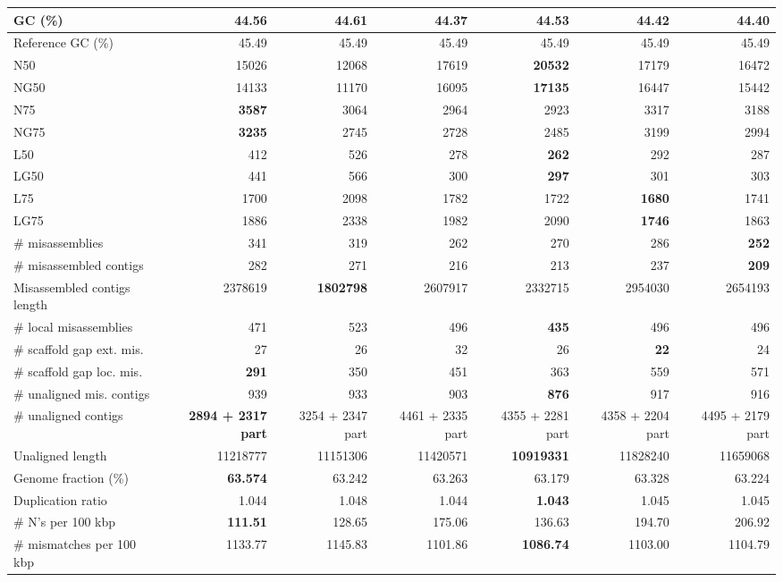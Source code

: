 \documentclass[12pt,a4paper]{article}
\begin{document}
\begin{table}[ht]
\begin{center}
\begin{tabular}{|l*{6}{|r}|}
GC (\%) & 44.56 & 44.61 & 44.37 & 44.53 & 44.42 & 44.40 \\ \hline
Reference GC (\%) & 45.49 & 45.49 & 45.49 & 45.49 & 45.49 & 45.49 \\ \hline
N50 & 15026 & 12068 & 17619 & {\bf 20532} & 17179 & 16472 \\ \hline
NG50 & 14133 & 11170 & 16095 & {\bf 17135} & 16447 & 15442 \\ \hline
N75 & {\bf 3587} & 3064 & 2964 & 2923 & 3317 & 3188 \\ \hline
NG75 & {\bf 3235} & 2745 & 2728 & 2485 & 3199 & 2994 \\ \hline
L50 & 412 & 526 & 278 & {\bf 262} & 292 & 287 \\ \hline
LG50 & 441 & 566 & 300 & {\bf 297} & 301 & 303 \\ \hline
L75 & 1700 & 2098 & 1782 & 1722 & {\bf 1680} & 1741 \\ \hline
LG75 & 1886 & 2338 & 1982 & 2090 & {\bf 1746} & 1863 \\ \hline
\# misassemblies & 341 & 319 & 262 & 270 & 286 & {\bf 252} \\ \hline
\# misassembled contigs & 282 & 271 & 216 & 213 & 237 & {\bf 209} \\ \hline
Misassembled contigs length & 2378619 & {\bf 1802798} & 2607917 & 2332715 & 2954030 & 2654193 \\ \hline
\# local misassemblies & 471 & 523 & 496 & {\bf 435} & 496 & 496 \\ \hline
\# scaffold gap ext. mis. & 27 & 26 & 32 & 26 & {\bf 22} & 24 \\ \hline
\# scaffold gap loc. mis. & {\bf 291} & 350 & 451 & 363 & 559 & 571 \\ \hline
\# unaligned mis. contigs & 939 & 933 & 903 & {\bf 876} & 917 & 916 \\ \hline
\# unaligned contigs & {\bf 2894 + 2317 part} & 3254 + 2347 part & 4461 + 2335 part & 4355 + 2281 part & 4358 + 2204 part & 4495 + 2179 part \\ \hline
Unaligned length & 11218777 & 11151306 & 11420571 & {\bf 10919331} & 11828240 & 11659068 \\ \hline
Genome fraction (\%) & {\bf 63.574} & 63.242 & 63.263 & 63.179 & 63.328 & 63.224 \\ \hline
Duplication ratio & 1.044 & 1.048 & 1.044 & {\bf 1.043} & 1.045 & 1.045 \\ \hline
\# N's per 100 kbp & {\bf 111.51} & 128.65 & 175.06 & 136.63 & 194.70 & 206.92 \\ \hline
\# mismatches per 100 kbp & 1133.77 & 1145.83 & 1101.86 & {\bf 1086.74} & 1103.00 & 1104.79 \\ \hline

\end{tabular}
\end{center}
\end{table}
\end{document}
